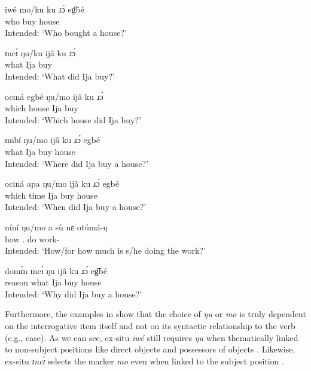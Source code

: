 \documentclass[output=paper,colorlinks,citecolor=brown
]{langscibook}
\begin{document}
\ea \label{ex:matte:10}
\begin{xlist}

\ex \label{ex:matte:10a} 
\gll * iwé mo/ku {\longrule} ku ɹɔ́ eg͡bé\\
{} who \Foc{} {} \Pfv{} buy house\\
\glt Intended: `Who bought a house?'

\ex \label{ex:matte:10b}
\gll * ɪncɪ́ ŋu/ku ijâ ku ɹɔ́ {\longrule}\\
{} what \Foc{} Ija \Pfv{} buy {}\\
\glt Intended: `What did Ija buy?'

\ex \label{ex:matte:10g}
\gll * ocɪná egbé ŋu/mo ijâ ku ɹɔ́ {\longrule}\\
{} which house \Foc{} Ija \Pfv{} buy {}\\
\glt Intended: `Which house did Ija buy?'

\ex \label{ex:matte:10c}
\gll * ɪmbí ŋu/mo ijâ ku ɹɔ́ egbé {\longrule}\\
{} what \Foc{} Ija \Pfv{} buy house {}\\
\glt Intended: `Where did Ija buy a house?'

\ex \label{ex:matte:10d}
\gll * ocɪná apa ŋu/mo ijâ ku ɹɔ́ egbé {\longrule}\\
{} which time \Foc{} Ija \Pfv{} buy house {}\\
\glt Intended: `When did Ija buy a house?'

\ex \label{ex:matte:10e}
\gll * níní ŋu/mo a sù nɛ otúmá-ŋ {\longrule}\\
{} how \Foc{} \Tsg{}.\Nom{} \Prog{} do work-\Def{}\\
\glt Intended: `How/for how much is s/he doing the work?'

\ex \label{ex:matte:10f}
\gll * domɪ́n ɪncɪ́ ŋu ijâ ku ɹɔ́ eg͡bé {\longrule}\\
{} reason what \Foc{} Ija \Pfv{} buy house\\
\glt Intended: `Why did Ija buy a house?'

\end{xlist}
\z

Furthermore, the examples in  show that the choice of \textit{ŋu} or \textit{mo} is truly dependent on the interrogative item itself and not on its syntactic relationship to the verb (e.g., case). As we can see, ex-situ \textit{iwé} still requires \textit{ŋu} when thematically linked to non-subject positions like direct objects  and possessors of objects . Likewise, ex-situ \textit{ɪncɪ́} selects the marker \textit{mo} even when linked to the subject position . 
\end{document}
